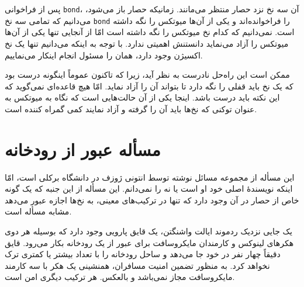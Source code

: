 \documentclass{book}
\begin{document}
    پس از فراخوانی {\tt bond}، آن سه نخ نزد حصار منتظر می‌مانند. زمانیکه حصار باز می‌شود، می‌دانیم که تمامی سه نخ {\tt bond} را فراخوانده‌اند و 
    یکی از آن‌ها میوتکس را نگه داشته است. نمی‌دانیم که  کدام نخ میوتکس را نگه داشته است امّا 
    از آنجایی تنها یکی از آن‌ها میوتکس را آزاد می‌نماید دانستنش اهمیتی ندارد. با توجه به اینکه می‌دانیم تنها یک نخ اکسیژن وجود دارد، 
    همان را مسئول انجام اینکار می‌نماییم. 

    ممکن است این راه‌حل نادرست به نظر آید، زیرا که تاکنون عموماً اینگونه درست بود که یک نخ باید قفلی را نگه دارد تا بتواند آن را آزاد نماید. 
    امّا هیچ قاعده‌ای نمی‌گوید که  این نکته باید درست باشد. اینجا یکی از آن حالت‌هایی است که نگاه به میوتکس به عنوان توکنی که نخ‌ها باید آن را گرفته و آزاد 
    نمایند کمی گمراه کننده است. 
    
    
\section {مسأله عبور از رودخانه}

    این مسأله از مجموعه مسائل نوشته توسط انتونی ژوزف در دانشگاه برکلی
    است، امّا اینکه نویسندهٔ اصلی خود او است یا نه را نمی‌دانم. این مسأله از این جنبه که یک گونه خاص از حصار در آن وجود دارد که تنها در ترکیب‌های 
    معینی، به نخ‌ها اجازه عبور می‌دهد مشابه مسأله  است. 

    یک جایی نزدیک ردموند ایالت واشنگتن، یک قایق پارویی وجود دارد که بوسیله هر دوی هکرهای لینوکس و 
    کارمندان مایکروسافت برای عبور از یک رودخانه بکار می‌رود.  قایق دقیقاً چهار نفر در خود جا می‌دهد و ساحل رودخانه را با تعداد بیشتر یا کمتری ترک نخواهد کرد. 
    به منظور تضمین امنیت مسافران، همنشینی یک هکر با سه کارمند مایکروسافت مجاز نمی‌باشد و بالعکس. هر ترکیب دیگری امن است. 
\end{document}
